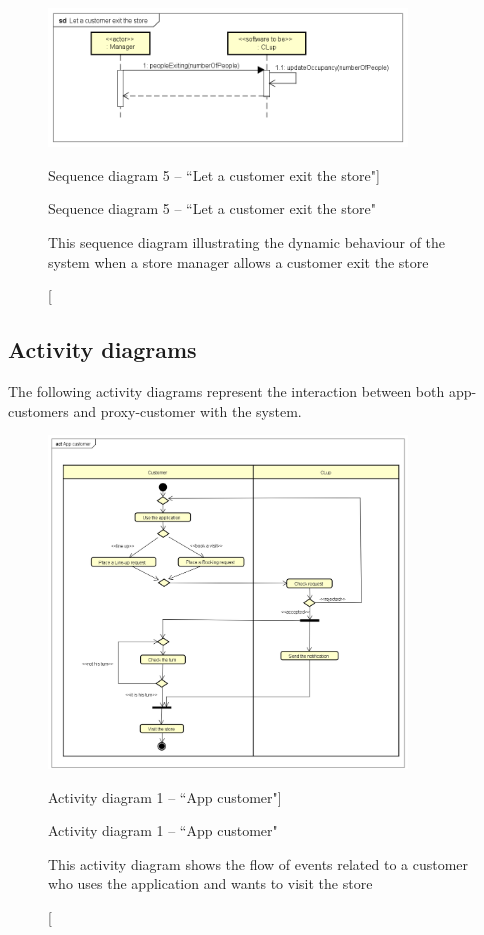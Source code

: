 \documentclass[a4paper,oneside,11pt]{book}   %
\newcommand{\captionrasd}[2]{\caption[#1]{#1 \par \small #2}}
\begin{document}
    \begin{figure}[H]
        \centering
        \includegraphics[width=0.85\textwidth, keepaspectratio]{pictures/sequence_diagrams/let_customer_exit_store}
        \captionrasd{Sequence diagram 5 -- ``Let a customer exit the store"}{This sequence diagram illustrating the dynamic behaviour of the system when a store manager allows a customer exit the store}
        \label{figure:sequence_diagram_5_let_customer_exit_store}
    \end{figure}
    
    \subsection{Activity diagrams}
    The following activity diagrams represent the interaction between both app-customers and proxy-customer with the system.
    
    \begin{figure}[H]
        \centering
        \includegraphics[width=0.85\textwidth, keepaspectratio]{pictures/activity_diagrams/app_customer}
        \captionrasd{Activity diagram 1 -- ``App customer"}{This activity diagram shows the flow of events related to a customer who uses the application and wants to visit the store}
        \label{figure:activity_diagram_1_app_customer}
    \end{figure}
    
\end{document}
